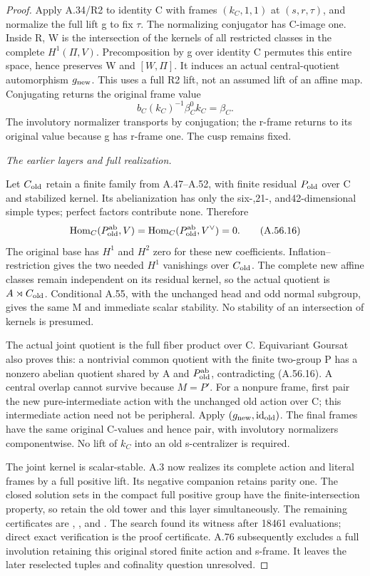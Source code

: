 \begin{proof}
Apply A.34/R2 to identity C with frames \((k_C,1,1)\) at
\((s,r,\tau)\), and normalize the full lift g to fix \(\tau\).
The normalizing conjugator has C-image one. Inside R, W is the
intersection of the kernels of all restricted classes in the
complete \(H^1(\Pi,V)\). Precomposition by g over identity C
permutes this entire space, hence preserves W and \([W,\Pi]\).
It induces an actual central-quotient automorphism \(g_{\rm new}\).
This uses a full R2 lift, not an assumed lift of an affine map.
Conjugating returns the original frame value
\[
 b_C(k_C)^{-1}\beta_C^0k_C=\beta_C.\tag{A.56.15}
\]
The involutory normalizer transports by conjugation; the r-frame
returns to its original value because g has r-frame one. The cusp
remains fixed.

\emph{The earlier layers and full realization.}\par
Let \(C_{\rm old}\) retain a finite family from A.47--A.52, with
finite residual \(P_{\rm old}\) over C and stabilized kernel.
Its abelianization has only the six-,21-, and42-dimensional simple
types; perfect factors contribute none. Therefore
\[
 \operatorname{Hom}_C(P_{\rm old}^{\rm ab},V)
 =\operatorname{Hom}_C(P_{\rm old}^{\rm ab},V^\vee)=0.
 \tag{A.56.16}
\]
The original base has \(H^1\) and \(H^2\) zero for these new
coefficients. Inflation--restriction gives the two needed \(H^1\)
vanishings over \(C_{\rm old}\). The complete new affine classes
remain independent on its residual kernel, so the actual quotient
is \(A\rtimes C_{\rm old}\). Conditional A.55, with the unchanged
head and odd normal subgroup, gives the same M and immediate scalar
stability. No stability of an intersection of kernels is presumed.

The actual joint quotient is the full fiber product over C.
Equivariant Goursat also proves this: a nontrivial common quotient
with the finite two-group P has a nonzero abelian quotient shared
by A and \(P_{\rm old}^{\rm ab}\), contradicting (A.56.16).
A central overlap cannot survive because \(M=P'\).
For a nonpure frame, first pair the new pure-intermediate action
with the unchanged old action over C; this intermediate action need
not be peripheral. Apply \((g_{\rm new},\operatorname{id}_{\rm old})\).
The final frames have the same original C-values and hence pair,
with involutory normalizers componentwise. No lift of \(k_C\) into
an old s-centralizer is required.

The joint kernel is scalar-stable. A.3 now realizes its complete
action and literal frames by a full positive lift. Its negative
companion retains parity one. The closed solution sets in the
compact full positive group have the finite-intersection property,
so retain the old tower and this layer simultaneously.
The remaining certificates are ,
, and
. The search found its witness
after 18461 evaluations; direct exact verification is the proof
certificate. A.76 subsequently excludes a full involution retaining
this original stored finite action and s-frame. It leaves the later
reselected tuples and cofinality question unresolved.
\end{proof}

